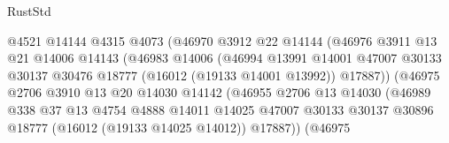 \begin{lexlean}{RustStd}
\begin{coremodule}
                                    @4521
                                    @14144
                                    @4315
                                    @4073
                                    (@46970
                                      @3912
                                      @22
                                      @14144
                                      (@46976
                                        @3911
                                        @13
                                        @21
                                        @14006
                                        @14143
                                        (@46983
                                          @14006
                                          (@46994
                                            @13991
                                            @14001
                                            @47007
                                            @30133
                                            @30137
                                            @30476
                                            @18777
                                            (@16012 (@19133 @14001 @13992))
                                            @17887))
                                        (@46975
                                          @2706
                                          @3910
                                          @13
                                          @20
                                          @14030
                                          @14142
                                          (@46955
                                            @2706
                                            @13
                                            @14030
                                            (@46989
                                              @338
                                              @37
                                              @13
                                              @4754
                                              @4888
                                              @14011
                                              @14025
                                              @47007
                                              @30133
                                              @30137
                                              @30896
                                              @18777
                                              (@16012 (@19133 @14025 @14012))
                                              @17887))
                                          (@46975

\end{coremodule}
\end{lexlean}
